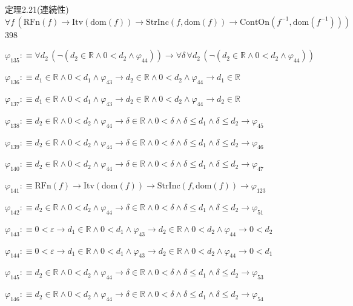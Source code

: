 \begin{fullproof}{定理2.21(連続性)}{$\forall f\,(\mathrm{RFn}(f) \to \mathrm{Itv}(\mathrm{dom}(f)) \to \mathrm{StrInc}(f,\mathrm{dom}(f)) \to \mathrm{ContOn}(f^{-1},\mathrm{dom}(f^{-1})))$}{398}
\begin{abbrevlist}
\item $\varphi_{135} :\equiv \forall d_{2}\,(\neg (d_{2} \in \mathbb{R} \land 0 < d_{2} \land \varphi_{44})) \to \forall \delta\,\forall d_{2}\,(\neg (d_{2} \in \mathbb{R} \land 0 < d_{2} \land \varphi_{44}))$
\item $\varphi_{136} :\equiv d_{1} \in \mathbb{R} \land 0 < d_{1} \land \varphi_{43} \to d_{2} \in \mathbb{R} \land 0 < d_{2} \land \varphi_{44} \to d_{1} \in \mathbb{R}$
\item $\varphi_{137} :\equiv d_{1} \in \mathbb{R} \land 0 < d_{1} \land \varphi_{43} \to d_{2} \in \mathbb{R} \land 0 < d_{2} \land \varphi_{44} \to d_{2} \in \mathbb{R}$
\item $\varphi_{138} :\equiv d_{2} \in \mathbb{R} \land 0 < d_{2} \land \varphi_{44} \to \delta \in \mathbb{R} \land 0 < \delta \land \delta \leq d_{1} \land \delta \leq d_{2} \to \varphi_{45}$
\item $\varphi_{139} :\equiv d_{2} \in \mathbb{R} \land 0 < d_{2} \land \varphi_{44} \to \delta \in \mathbb{R} \land 0 < \delta \land \delta \leq d_{1} \land \delta \leq d_{2} \to \varphi_{46}$
\item $\varphi_{140} :\equiv d_{2} \in \mathbb{R} \land 0 < d_{2} \land \varphi_{44} \to \delta \in \mathbb{R} \land 0 < \delta \land \delta \leq d_{1} \land \delta \leq d_{2} \to \varphi_{47}$
\item $\varphi_{141} :\equiv \mathrm{RFn}(f) \to \mathrm{Itv}(\mathrm{dom}(f)) \to \mathrm{StrInc}(f,\mathrm{dom}(f)) \to \varphi_{123}$
\item $\varphi_{142} :\equiv d_{2} \in \mathbb{R} \land 0 < d_{2} \land \varphi_{44} \to \delta \in \mathbb{R} \land 0 < \delta \land \delta \leq d_{1} \land \delta \leq d_{2} \to \varphi_{51}$
\item $\varphi_{143} :\equiv 0 < \varepsilon \to d_{1} \in \mathbb{R} \land 0 < d_{1} \land \varphi_{43} \to d_{2} \in \mathbb{R} \land 0 < d_{2} \land \varphi_{44} \to 0 < d_{2}$
\item $\varphi_{144} :\equiv 0 < \varepsilon \to d_{1} \in \mathbb{R} \land 0 < d_{1} \land \varphi_{43} \to d_{2} \in \mathbb{R} \land 0 < d_{2} \land \varphi_{44} \to 0 < d_{1}$
\item $\varphi_{145} :\equiv d_{2} \in \mathbb{R} \land 0 < d_{2} \land \varphi_{44} \to \delta \in \mathbb{R} \land 0 < \delta \land \delta \leq d_{1} \land \delta \leq d_{2} \to \varphi_{53}$
\item $\varphi_{146} :\equiv d_{2} \in \mathbb{R} \land 0 < d_{2} \land \varphi_{44} \to \delta \in \mathbb{R} \land 0 < \delta \land \delta \leq d_{1} \land \delta \leq d_{2} \to \varphi_{54}$

\end{abbrevlist}
\end{fullproof}

